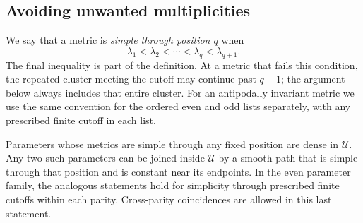 \subsection{Avoiding unwanted multiplicities}

We say that a metric is \emph{simple through position \(q\)} when
\[
 \lambda_1<\lambda_2<\cdots<\lambda_q<\lambda_{q+1}.
\]
The final inequality is part of the definition.  At a metric that fails
this condition, the repeated cluster meeting the cutoff may continue
past \(q+1\); the argument below always includes that entire cluster.
For an antipodally invariant metric we use the same convention for the
ordered even and odd lists separately, with any prescribed finite cutoff
in each list.

\begin{lemma}\label{n:lem-avoidance}
Parameters whose metrics are simple through any fixed position are dense
in \(\mathcal U\).
Any two such parameters can be joined inside \(\mathcal U\) by a smooth
path that is simple through that position and is constant near its
endpoints.  In the even parameter family, the analogous statements hold
for simplicity through prescribed finite cutoffs within each parity.
Cross-parity coincidences are allowed in this last statement.
\end{lemma}

